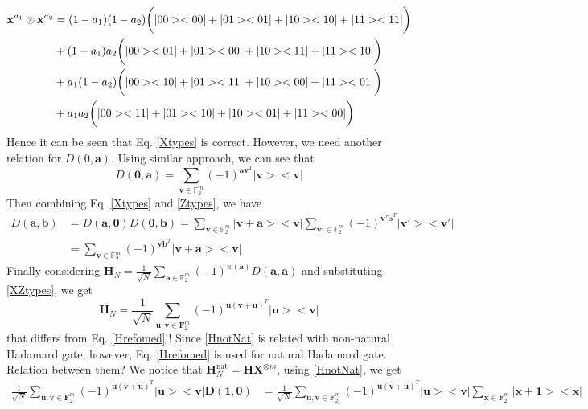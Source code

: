 \documentclass{article}
\begin{document}
{\begin{align*}
			\mathbf{x}^{a_1} \otimes \mathbf{x}^{a_2} &= (1-a_1)(1-a_2)\bigg{(} |00><00|+|01><01|+|10><10|+|11><11| \bigg{)}\\
			&+ (1-a_1)a_2\bigg{(} |00><01|+|01><00|+|10><11|+|11><10| \bigg{)} \\
			&+a_1(1-a_2)\bigg{(} |00><10|+|01><11|+|10><00|+|11><01| \bigg{)} \\
			&+a_1 a_2 \bigg{(} |00><11|+|01><10|+|10><01|+|11><00| \bigg{)}
		\end{align*}
		Hence it can be seen that Eq. \eqref{Xtypes} is correct. However, we need another relation for $D\left(0, \mathbf{a}\right)$. Using similar approach, we can see that 
		\begin{equation}\label{Ztypes}
			D\left(\mathbf{0},\mathbf{a}\right) = \sum_{\mathbf{v}\in \mathbb{F}_2^m}{ (-1)^{\mathbf{a} \mathbf{v}^T} |\mathbf{v}><\mathbf{v}|}
		\end{equation}
		Then combining Eq. \eqref{Xtypes} and \eqref{Ztypes}, we have 
		\begin{align}\label{XZtypes}
			D\left(\mathbf{a}, \mathbf{b}\right) &= D\left(\mathbf{a}, \mathbf{0}\right) D\left(\mathbf{0}, \mathbf{b}\right) = \sum_{\mathbf{v} \in \mathbb{F}_2^m}{|\mathbf{v+a}><\mathbf{v}|}  \sum_{\mathbf{v}'\in \mathbb{F}_2^m}{ (-1)^{\mathbf{v}' \mathbf{b}^T} |\mathbf{v}'><\mathbf{v}'|} \nonumber \\
			& = \sum_{\mathbf{v} \in \mathbb{F}_2^m}{(-1)^{\mathbf{v} \mathbf{b}^T} |\mathbf{v+a}><\mathbf{v}|}
		\end{align}
		Finally considering $\mathbf{H}_N = \frac{1}{\sqrt{N}} \sum_{\mathbf{a} \in \mathbb{F}_2^m} (-1)^{w(\mathbf{a})} D\left( \mathbf{a}, \mathbf{a} \right)$ and substituting \eqref{XZtypes}, we get
		\begin{equation}\label{HnotNat}
			\mathbf{H}_N = \frac{1}{\sqrt{N}} \sum_{\mathbf{u}, \mathbf{v} \in \mathbf{F}_2^m}{\left(-1\right)^{\mathbf{u} (\mathbf{v+u})^T } |\mathbf{u}><\mathbf{v}|}
		\end{equation}
	that differs from	Eq. \eqref{Hrefomed}!! Since \eqref{HnotNat} is related with non-natural Hadamard gate, however, Eq. \eqref{Hrefomed} is used for natural Hadamard gate. Relation between them? We notice that $\mathbf{H}_N^{\text{nat}} = \mathbf{H}\mathbf{X}^{\otimes m}$, using \eqref{HnotNat}, we get
	\begin{align*}
		\frac{1}{\sqrt{N}} \sum_{\mathbf{u}, \mathbf{v} \in \mathbf{F}_2^m}{\left(-1\right)^{\mathbf{u} (\mathbf{v+u})^T } |\mathbf{u}><\mathbf{v}|}\mathbf{D}(\mathbf{1,0}) &= \frac{1}{\sqrt{N}} \sum_{\mathbf{u}, \mathbf{v} \in \mathbf{F}_2^m}{\left(-1\right)^{\mathbf{u} (\mathbf{v+u})^T } |\mathbf{u}><\mathbf{v}|}\sum_{\mathbf{x} \in \mathbf{F}_2^m}{ |\mathbf{x+1}><\mathbf{x}|} \\

\end{align*}}
\end{document}
